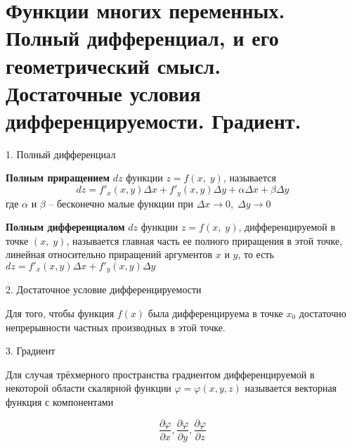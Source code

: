 \section{
	Функции многих переменных. Полный дифференциал, и его геометрический смысл. \\
    Достаточные условия дифференцируемости. Градиент. 
}

1. Полный дифференциал

\textbf{Полным приращением} $dz$ функции $z=f(x,\;y)$, называется 
$$dz=f'_{x}(x, y)\varDelta x + f'_{y}(x,y)\varDelta y + \alpha \varDelta x + \beta \varDelta y$$
где $\alpha$ и $\beta$ – бесконечно малые функции при $\varDelta x \rightarrow 0,\; \varDelta y \rightarrow 0$

\textbf{Полным дифференциалом} $dz$ функции $z=f(x,\;y)$,
дифференцируемой в точке $(x,\;y)$, называется главная часть ее полного
приращения в этой точке, линейная относительно приращений аргументов $x$ и 
$y$, то есть $dz=f'_{x}(x, y)\varDelta  x + f'_{y}(x,y)\varDelta  y$

2. Достаточное условие дифференцируемости

Для того, чтобы функция $f(x)$ была дифференцируема в точке $x_0$ 
достаточно непрерывности частных производных в этой точке.

3. Градиент

Для случая трёхмерного пространства градиентом дифференцируемой в некоторой области скалярной функции 
$\varphi =\varphi (x,y,z)$ называется векторная функция с компонентами

$$
\frac{\partial \varphi }{\partial x},
\frac{\partial \varphi }{\partial y},
\frac{\partial \varphi }{\partial z}
$$
